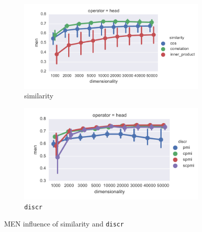 \begin{figure}[b]
  \centering
  \begin{subfigure}[t]{0.49\textwidth}
    \hspace{-20pt}
    \includegraphics[width=1.1\textwidth]{supplement/figures/men-interaction-similarity}

  \caption{similarity}
  \label{fig:men-similarity}
  \end{subfigure}
  \begin{subfigure}[t]{0.49\textwidth}
    \includegraphics[width=\textwidth]{supplement/figures/men-interaction-discr}

  \caption{\texttt{discr}}
  \label{fig:men-discr}
  \end{subfigure}

  \caption{MEN influence of similarity and \texttt{discr}}
\end{figure}

